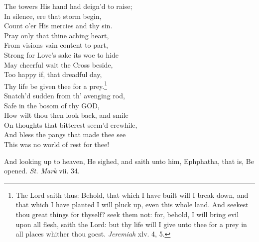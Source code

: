 The towers His hand had deign’d to raise; \\
 In silence, ere that storm begin, \\
 Count o’er His mercies and thy sin. \\
  Pray only that thine aching heart, \\
 From visions vain content to part, \\
 Strong for Love’s sake its woe to hide \\
 May cheerful wait the Cross beside, \\
 Too happy if, that dreadful day, \\
 Thy life be given thee for a prey.\footnote{The Lord saith thus: Behold, that which I have built will I break down, and that which I have planted I will pluck up, even this whole land. And seekest thou great things for thyself? seek them not: for, behold, I will bring evil upon all flesh, saith the Lord: but thy life will I give unto thee for a prey in all places whither thou goest. \emph{Jeremiah} xlv. 4, 5.} \\
  Snatch’d sudden from th’ avenging rod, \\
 Safe in the bosom of thy GOD, \\
 How wilt thou then look back, and smile \\
 On thoughts that bitterest seem’d erewhile, \\
 And bless the pangs that made thee see \\
 This was no world of rest for thee!\\


And looking up to heaven, He sighed, and saith unto him, Ephphatha, that is, Be opened. \emph{St. Mark} vii. 34.

